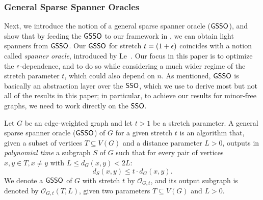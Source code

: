 
\subsubsection{General Sparse Spanner Oracles}\label{subsec:oracle-intro}

Next, we introduce the notion of a general sparse spanner oracle ($\mathsf{GSSO}$), and show that by feeding the $\mathsf{GSSO}$ to our framework in , we can obtain light spanners from $\mathsf{GSSO}$. 
Our $\mathsf{GSSO}$ for stretch $t = (1+\epsilon)$ coincides with a notion called {\em spanner oracle}, introduced by Le~\cite{LS20}. Our focus in this paper is to optimize the $\epsilon$-dependence, and to do so while considering a much wider regime of the stretch parameter $t$, which could also depend on $n$. 
As mentioned, $\mathsf{GSSO}$ is basically an abstraction layer over the $\mathsf{SSO}$, which we use to derive most but not all of the results in this paper;
in particular, to achieve our results for minor-free graphs, we need to work directly on the $\mathsf{SSO}$.

\begin{definition}\label{def:oracle} Let $G$ be  an edge-weighted graph and let $t > 1$ be a stretch parameter. A general sparse spanner oracle ($\mathsf{GSSO}$) of $G$ for a given stretch $t$ is an algorithm that, given a subset of vertices  $T\subseteq V(G)$ and a distance parameter $L > 0$, outputs in \emph{polynomial time} a subgraph $S$ of $G$ such that for every pair of vertices $x,y \in T, x\not= y$ with $L \leq d_G(x,y) < 2L$:
	\begin{equation}
		d_{S}(x,y)\leq t\cdot d_G(x,y).
	\end{equation}	
	We denote a $\mathsf{GSSO}$ of $G$ with stretch $t$ by  $\mathcal{O}_{G,t}$, and its output subgraph is denoted by $\mathcal{O}_{G,t}(T,L)$, given two parameters $T\subseteq V(G)$ and $L >0$.
\end{definition}



